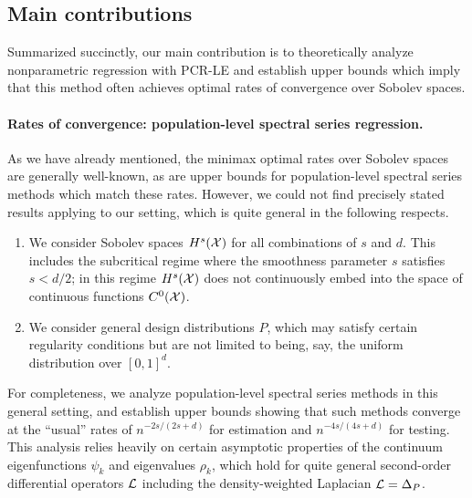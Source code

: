 \subsection{Main contributions}
Summarized succinctly, our main contribution is to theoretically analyze nonparametric regression with PCR-LE and establish upper bounds which imply that this method often achieves optimal rates of convergence over Sobolev spaces.

\paragraph{Rates of convergence: population-level spectral series regression.}
As we have already mentioned, the minimax optimal rates over Sobolev spaces are generally well-known, as are upper bounds for population-level spectral series methods which match these rates. However, we could not find precisely stated results applying to our setting, which is quite general in the following respects.
\begin{enumerate}
	\item We consider Sobolev spaces $H^s(\mathcal{X})$ for all combinations of $s$ and $d$. This includes the subcritical regime where the smoothness parameter $s$ satisfies $s < d/2$; in this regime $H^s(\mathcal{X})$ does not continuously embed into the space of continuous functions $C^0(\mathcal{X})$.
	\item We consider general design distributions $P$, which may satisfy certain regularity conditions but are not limited to being, say, the uniform distribution over $[0,1]^d$. 
\end{enumerate}
For completeness, we analyze population-level spectral series methods in this general setting, and establish upper bounds showing that such methods converge at the ``usual'' rates of $n^{-2s/(2s + d)}$ for estimation and $n^{-4s/(4s + d)}$ for testing. This analysis relies heavily on certain asymptotic properties of the continuum eigenfunctions $\psi_k$ and eigenvalues $\rho_k$, which hold for quite general second-order differential operators $\mathcal{L}$ including the density-weighted Laplacian $\mathcal{L} = \Delta_P$.

